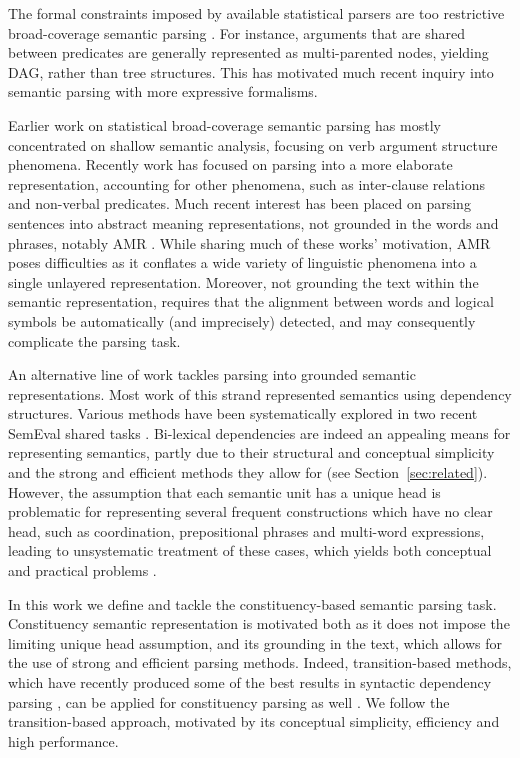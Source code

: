 \documentclass[11pt]{article}
\newcommand{\secref}[1]{Section~\ref{#1}}
\begin{document}
The formal constraints imposed by available statistical parsers are too restrictive
broad-coverage semantic parsing \cite{oepen2015semeval}.
For instance, arguments that are shared
between predicates are generally represented as multi-parented nodes,
yielding DAG, rather than tree structures. This has motivated much recent
inquiry into semantic parsing with more expressive formalisms.

Earlier work on statistical broad-coverage semantic parsing has mostly
concentrated on shallow semantic analysis, focusing on verb argument structure phenomena.
Recently work has focused on parsing into a more elaborate representation, accounting
for other phenomena, such as inter-clause relations and non-verbal predicates.
Much recent interest has been placed on parsing sentences into abstract meaning representations,
not grounded in the words and phrases, notably AMR \cite{banarescu2013abstract}.
While sharing much of these works' motivation, AMR poses difficulties as it conflates
a wide variety of linguistic phenomena into a single unlayered representation.
Moreover, not grounding the text within the semantic representation,
requires that the alignment between words and logical symbols be automatically
(and imprecisely) detected, and may consequently complicate the parsing task.

An alternative line of work tackles parsing into grounded semantic representations.
Most work of this strand represented semantics using dependency structures.
Various methods have been systematically explored
in two recent SemEval shared tasks \cite{oepen2014semeval,oepen2015semeval}.
Bi-lexical dependencies are indeed an appealing means for representing semantics, partly due to
their structural and conceptual simplicity and the strong and efficient
methods they allow for (see \secref{sec:related}).
However, the assumption that each semantic unit has a unique head is
problematic for representing several frequent constructions which have no clear
head, such as coordination, prepositional phrases and multi-word expressions,
leading to unsystematic treatment of these cases, which yields both conceptual
and practical problems \cite{schwartz2011neutralizing,Ivanova2012who,tsarfaty2012cross}.

In this work we define and tackle the constituency-based semantic parsing task.
Constituency semantic representation is motivated both as it does not
impose the limiting unique head assumption, and its grounding in the text,
which allows for the use of strong and efficient parsing methods.
Indeed, transition-based methods, which have recently produced some of the best
results in syntactic dependency parsing \cite{dyer2015transition,ballesteros2015improved},
can be applied
for constituency parsing as well \cite{sagae2005classifier,zhu2013fast,maier2015discontinuous}. 
We follow the transition-based approach, motivated by its conceptual simplicity,
efficiency and high performance.
\end{document}
